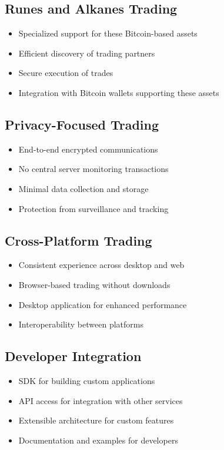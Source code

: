 \documentclass[11pt,a4paper]{article}
\begin{document}
\subsection{Runes and Alkanes Trading}

\begin{itemize}
    \item Specialized support for these Bitcoin-based assets
    \item Efficient discovery of trading partners
    \item Secure execution of trades
    \item Integration with Bitcoin wallets supporting these assets
\end{itemize}

\subsection{Privacy-Focused Trading}

\begin{itemize}
    \item End-to-end encrypted communications
    \item No central server monitoring transactions
    \item Minimal data collection and storage
    \item Protection from surveillance and tracking
\end{itemize}

\subsection{Cross-Platform Trading}

\begin{itemize}
    \item Consistent experience across desktop and web
    \item Browser-based trading without downloads
    \item Desktop application for enhanced performance
    \item Interoperability between platforms
\end{itemize}

\subsection{Developer Integration}

\begin{itemize}
    \item SDK for building custom applications
    \item API access for integration with other services
    \item Extensible architecture for custom features
    \item Documentation and examples for developers
\end{itemize}
\end{document}
